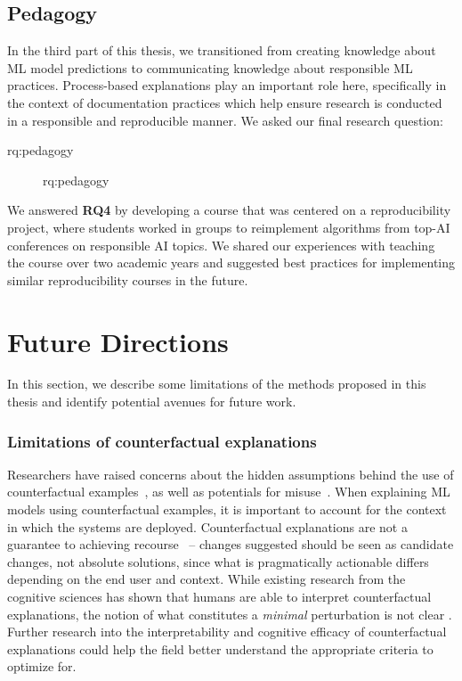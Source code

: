 \subsection{Pedagogy}
In the third part of this thesis, we transitioned from creating knowledge about ML model predictions to communicating knowledge about responsible ML practices. 
Process-based explanations play an important role here, specifically in the context of documentation practices which help ensure research is conducted in a responsible and reproducible manner. 
We asked our final research question:

\begin{description}\item[\acs{rq:pedagogy}]\acl{rq:pedagogy}\end{description}

\noindent
We answered \textbf{RQ4} by developing a course that was centered on a reproducibility project, where students worked in groups to reimplement algorithms from top-AI conferences on responsible AI topics. 
We shared our experiences with teaching the course over two academic years and suggested best practices for implementing similar reproducibility courses in the future. 

\section{Future Directions}
\label{section:conclusion-futurework}
In this section, we describe some limitations of the methods proposed in this thesis and identify potential avenues for future work. 



\subsubsection{Limitations of counterfactual explanations}
Researchers have raised concerns about the hidden assumptions behind the use of counterfactual examples~\citep{barocas_hidden_2019}, as well as potentials for misuse~\citep{kasirzadeh2021use}. 
When explaining ML models using counterfactual examples, it is important to account for the context in which the systems are deployed. 
Counterfactual explanations are not a guarantee to achieving recourse~\citep{ustun_actionable_2019} -- changes suggested should be seen as candidate changes, not absolute solutions, since what is pragmatically actionable differs depending on the end user and context. 
%
While existing research from the cognitive sciences has shown that humans are able to interpret counterfactual explanations, the notion of what constitutes a \emph{minimal} perturbation is not clear \citep{byrne-2016-counterfactual}. 
Further research into the interpretability and cognitive efficacy of counterfactual explanations could help the field better understand the appropriate criteria to optimize for. 


